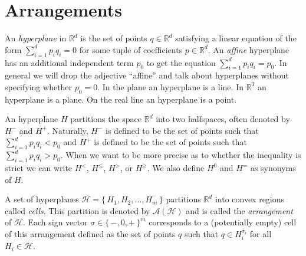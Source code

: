 \chapter{Arrangements}

An \emph{hyperplane} in \(\mathbb{R}^d\) is the set of points \(q \in \mathbb{R}^d\)
satisfying a linear equation of the form \(\sum_{i=1}^{d} p_i q_i = 0\) for
some tuple of coefficients \(p \in \mathbb{R}^d\). An \emph{affine} hyperplane has an
additional independent term \(p_0\) to get the equation \(\sum_{i=1}^{d}
p_i q_i = p_0\). In general we will drop the adjective ``affine'' and talk about
hyperplanes without specifying whether \(p_0 = 0\).
%
In the plane an hyperplane is a line. In \(\mathbb{R}^3\) an hyperplane is
a plane. On the real line an hyperplane is a point.

An hyperplane \(H\) partitions the space \(\mathbb{R}^d\) into two halfspaces,
often denoted by \(H^-\) and \(H^+\).
Naturally, \(H^-\) is defined to be the set of points such that
\(\sum_{i=1}^{d} p_i q_i < p_0 \) and \(H^+\) is defined to be the set of
points such that \(\sum_{i=1}^{d} p_i q_i > p_0 \). When we want to be more
precise as to whether the inequality is strict we can write \(H^{<}\),
\(H^{\leq}\), \(H^{>}\), or \(H^{\geq}\).
We also define \(H^0\) and \(H^{=}\) as synonyms of \(H\).

A set of hyperplanes \(\mathcal{H} = \{\, H_1, H_2, \ldots, H_m\,\}\)
partitions \(\mathbb{R}^d\) into convex regions called \emph{cells}.
%
This partition is denoted by \(\mathcal{A}(\mathcal{H})\) and is called the
\emph{arrangement} of \(\mathcal{H}\).
%
Each sign vector \(\sigma \in {\{\,-,0,+\,\}}^{m}\) corresponds to a
(potentially empty) cell of this arrangement defined as the set of points \(q\)
such that \(q \in H_i^{\sigma_i}\) for all \(H_i \in \mathcal{H}\).






